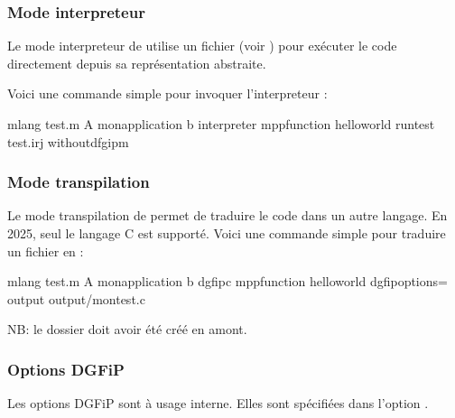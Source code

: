 \documentclass[letterpaper,10pt,french]{sphinxmanual}
\begin{document}
\subsubsection{Mode interpreteur}
\label{\detokenize{mlang:mode-interpreteur}}
\sphinxAtStartPar
Le mode interpreteur de  utilise un fichier  (voir {\hyperref[\detokenize{syntax_irj:syntax-irj}]{}})
pour exécuter le code  directement depuis sa représentation abstraite.

\sphinxAtStartPar
Voici une commande simple pour invoquer l’interpreteur :

\begin{sphinxVerbatim}[commandchars=\\\{\}]
\PYGZdl{} mlang test.m \PYGZbs{}
	\PYGZhy{}A mon\PYGZus{}application \PYGZbs{}
	\PYGZhy{}b interpreter \PYGZbs{}
	\PYGZhy{}\PYGZhy{}mpp\PYGZus{}function hello\PYGZus{}world \PYGZbs{}
	\PYGZhy{}\PYGZhy{}run\PYGZus{}test test.irj \PYGZbs{}
	\PYGZhy{}\PYGZhy{}without\PYGZus{}dfgip\PYGZus{}m
\end{sphinxVerbatim}


\subsubsection{Mode transpilation}
\label{\detokenize{mlang:mode-transpilation}}
\sphinxAtStartPar
Le mode transpilation de  permet de traduire le code  dans un autre
langage.
En 2025, seul le langage C est supporté.
Voici une commande simple pour traduire un fichier  en  :

\begin{sphinxVerbatim}[commandchars=\\\{\}]
\PYGZdl{} mlang test.m \PYGZbs{}
	\PYGZhy{}A mon\PYGZus{}application \PYGZbs{}
	\PYGZhy{}b dgfip\PYGZus{}c \PYGZbs{}
	\PYGZhy{}\PYGZhy{}mpp\PYGZus{}function hello\PYGZus{}world
	\PYGZhy{}\PYGZhy{}dgfip\PYGZus{}options=\PYGZsq{}\PYGZsq{} 
	\PYGZhy{}\PYGZhy{}output output/mon\PYGZhy{}test.c
\end{sphinxVerbatim}

\sphinxAtStartPar
NB: le dossier  doit avoir été créé en amont.


\subsubsection{Options DGFiP}
\label{\detokenize{mlang:options-dgfip}}
\sphinxAtStartPar
Les options DGFiP sont à usage interne. Elles sont spécifiées dans
l’option .
\end{document}
